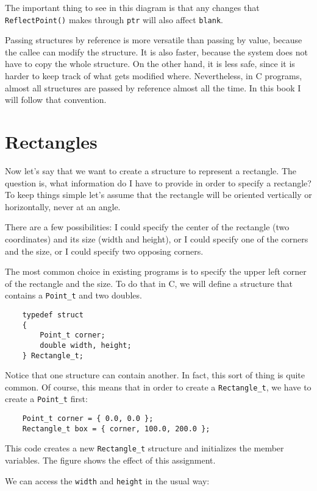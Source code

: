 The important thing to see in this diagram is that any changes that
{\tt ReflectPoint()} makes through {\tt ptr} will also affect {\tt blank}.

Passing structures by reference is more versatile than passing by
value, because the callee can modify the structure.  It is also
faster, because the system does not have to copy the whole
structure.  On the other hand, it is less safe, since it is harder to
keep track of what gets modified where.  Nevertheless, in C
programs, almost all structures are passed by reference almost all the
time.  In this book I will follow that convention.


\section{Rectangles}

Now let's say that we want to create a structure to represent
a rectangle.  The question is, what information do I have to
provide in order to specify a rectangle?  To keep things simple
let's assume that the rectangle will be oriented vertically or
horizontally, never at an angle.

There are a few possibilities: I could specify the center of
the rectangle (two coordinates) and its size (width and height),
or I could specify one of the corners and the size, or I
could specify two opposing corners.

The most common choice in existing programs is to specify the
upper left corner of the rectangle and the size.  To do that
in C, we will define a structure that contains a {\tt Point\_t}
and two doubles.

\begin{verbatim}
	typedef struct 
	{
		Point_t corner;
		double width, height;
	} Rectangle_t;  
\end{verbatim}
%
Notice that one structure can contain another.  In fact, this
sort of thing is quite common.  Of course, this means that in
order to create a {\tt Rectangle\_t}, we have to create a {\tt Point\_t}
first:

\begin{verbatim}
	Point_t corner = { 0.0, 0.0 };
	Rectangle_t box = { corner, 100.0, 200.0 };
\end{verbatim}
%
This code creates a new {\tt Rectangle\_t} structure and initializes the
member variables.  The figure shows the effect of this assignment.

\vspace{0.1in}
\centerline{}
\vspace{0.1in}
%
We can access the {\tt width} and {\tt height} in the usual way:

